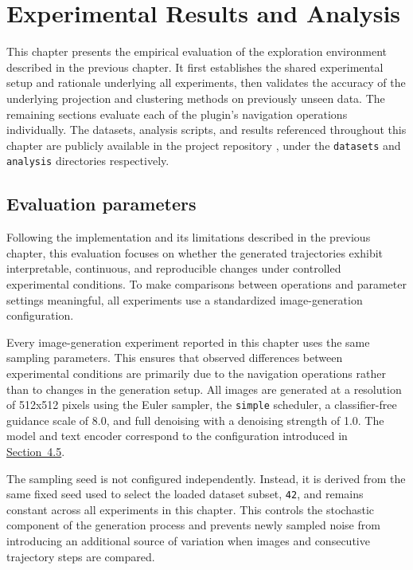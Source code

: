 \chapter{Experimental Results and Analysis}\label{ch:results}

This chapter presents the empirical evaluation of the exploration environment described in the previous chapter. It first establishes the shared experimental setup and rationale underlying all experiments, then validates the accuracy of the underlying projection and clustering methods on previously unseen data. The remaining sections evaluate each of the plugin's navigation operations individually. The datasets, analysis scripts, and results referenced throughout this chapter are publicly available in the project repository \cite{davidgh2026nels}, under the \texttt{datasets} and \texttt{analysis} directories respectively.

\section{Evaluation parameters}\label{sec:5.1}

Following the implementation and its limitations described in the previous chapter, this evaluation focuses on whether the generated trajectories exhibit interpretable, continuous, and reproducible changes under controlled experimental conditions. To make comparisons between operations and parameter settings meaningful, all experiments use a standardized image-generation configuration.

Every image-generation experiment reported in this chapter uses the same sampling parameters. This ensures that observed differences between experimental conditions are primarily due to the navigation operations rather than to changes in the generation setup. All images are generated at a resolution of 512x512 pixels using the Euler sampler, the \texttt{simple} scheduler, a classifier-free guidance scale of 8.0, and full denoising with a denoising strength of 1.0. The model and text encoder correspond to the configuration introduced in \hyperref[sec:4.5]{Section~4.5}.

The sampling seed is not configured independently. Instead, it is derived from the same fixed seed used to select the loaded dataset subset, \texttt{42}, and remains constant across all experiments in this chapter. This controls the stochastic component of the generation process and prevents newly sampled noise from introducing an additional source of variation when images and consecutive trajectory steps are compared.

